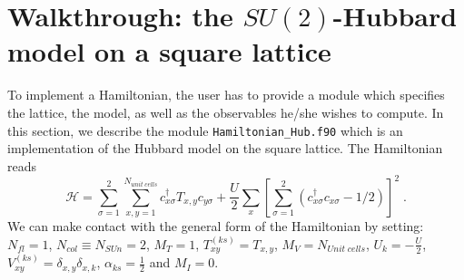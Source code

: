 \section{Walkthrough: the $SU(2)$-Hubbard model on a square lattice}
To implement a Hamiltonian, the user has to provide  a module   which  specifies the lattice, the model, as well as the observables  he/she  wishes to compute. 
In this section, we describe the module \texttt{Hamiltonian\_Hub.f90} which is an implementation of the Hubbard model on the square lattice. 
 The Hamiltonian reads 
\begin{equation}
\label{eqn_hubbard_sun}
\mathcal{H}=
\sum\limits_{\sigma=1}^{2} 
\sum\limits_{x,y =1 }^{N_{unit\; cells }} 
  c^{\dagger}_{x \sigma} T_{x,y}c^{\phantom\dagger}_{y \sigma} 
+ \frac{U}{2}\sum\limits_{x}\left[
\sum\limits_{\sigma=1}^{2}
\left(  c^{\dagger}_{x \sigma} c^{\phantom\dagger}_{x \sigma}  -1/2 \right) \right]^{2}\;.
\end{equation} 
We can make contact with the general form of the Hamiltonian by setting: 
$N_{fl} = 1$, $N_{col} \equiv N_{SUn}     =2 $,   $M_T    =    1$,  $T^{(ks)}_{x y}   =  T_{x,y}$,  $M_V   =  N_{Unit\; cells} $,  $U_{k}       =   -\frac{U}{2}$, 
 $V_{x y}^{(ks)} =  \delta_{x,y} \delta_{x,k}$,  $\alpha_{ks}   =  \frac{1}{2}  $ and $M_I       = 0 $.



